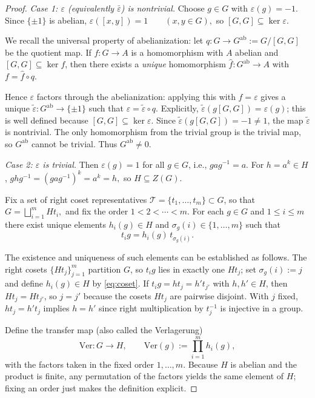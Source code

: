 \documentclass[12pt,oneside,a4paper]{article}
\theoremstyle{mytheorem}
\theoremstyle{remark}
\theoremstyle{definition}
\begin{document}
\begin{proof}
\emph{Case 1: $\varepsilon$ (equivalently $\bar\varepsilon$) is nontrivial.}
Choose $g\in G$ with $\varepsilon(g)=-1$. Since $\{\pm1\}$ is abelian,
$\varepsilon([x,y])=1\qquad(x,y\in G),$ so
$[G,G]\subseteq\ker\varepsilon$. 

We recall the universal property of abelianization: let $q:G\to G^{\mathrm{ab}}:=G/[G,G]$ be the quotient map. If $f:G\to A$ is a homomorphism with $A$ abelian and $[G,G]\subseteq\ker f$, then there exists a \emph{unique} homomorphism $\widehat f:G^{\mathrm{ab}}\to A$ with $f=\widehat f\circ q$.

Hence $\varepsilon$ factors through the abelianization: applying this with
$f=\varepsilon$ gives a unique
$\widetilde\varepsilon:G^{\mathrm{ab}}\to \{\pm1\}$ such that $\varepsilon=\widetilde\varepsilon\circ q .$ 
Explicitly,
$\widetilde\varepsilon(g[G,G])=\varepsilon(g)$; this is well defined because
$[G,G]\subseteq\ker\varepsilon$. Since
$\widetilde\varepsilon(g[G,G])=-1\neq1$, the map
$\widetilde\varepsilon$ is nontrivial. The only homomorphism from the trivial
group is the trivial map, so $G^{\mathrm{ab}}$ cannot be trivial. Thus
$G^{\mathrm{ab}}\neq0$.


\emph{Case 2: $\varepsilon$ is trivial.}
Then $\varepsilon(g)=1$ for all $g\in G$, i.e., $gag^{-1}=a$. For $h=a^k\in H$,
$ghg^{-1}=(gag^{-1})^k=a^k=h,$ so $H\subseteq Z(G)$.

Fix a set of right coset representatives
$\mathcal T=\{t_1,\dots,t_m\}\subset G$, so that $G=\bigsqcup_{i=1}^m Ht_i,$
and fix the order $1<2<\cdots<m$. For each $g\in G$ and $1\le i\le m$ there exist unique elements $h_i(g)\in H$ and $\sigma_g(i)\in\{1,\dots,m\}$ such that
\begin{equation}\label{eq:coset}
t_i g = h_i(g)\, t_{\sigma_g(i)}.
\end{equation}

The existence and uniqueness of such elements can be established as follows.   The right cosets $\{Ht_j\}_{j=1}^m$ partition $G$, so $t_ig$ lies in exactly one $Ht_j$; set $\sigma_g(i):=j$ and define $h_i(g)\in H$ by \eqref{eq:coset}.  
If $t_i g = h t_j = h' t_{j'}$ with $h,h'\in H$, then $Ht_j=Ht_{j'}$, so $j=j'$ because the cosets $Ht_j$ are pairwise disjoint. With $j$ fixed, $h t_j=h' t_j$ implies $h=h'$ since right multiplication by $t_j^{-1}$ is injective in a group.

Define the transfer map (also called the Verlagerung)
\[
\mathrm{Ver}:G\to H,\qquad \mathrm{Ver}(g):=\prod_{i=1}^m h_i(g),
\]
with
the factors taken in the fixed order $1,\dots,m$.
 Because $H$ is abelian and the product is finite, any permutation of the factors yields the same element of $H$; fixing an order just makes the definition explicit.



\end{proof}
\end{document}
